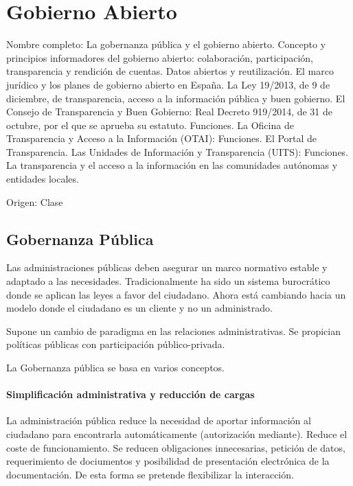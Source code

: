 \setcounter{section}{24}
\section{Gobierno Abierto}

Nombre completo: La gobernanza pública y el gobierno abierto. Concepto y principios informadores del gobierno abierto: colaboración, participación, transparencia y rendición de cuentas. Datos abiertos y reutilización. El marco jurídico y los planes de gobierno abierto en España. La Ley 19/2013, de 9 de diciembre, de transparencia, acceso a la información pública y buen gobierno. El Consejo de Transparencia y Buen Gobierno: Real Decreto 919/2014, de 31 de octubre, por el que se aprueba su estatuto. Funciones. La Oficina de Transparencia y Acceso a la Información (OTAI): Funciones. El Portal de Transparencia. Las Unidades de Información y Transparencia (UITS): Funciones. La transparencia y el acceso a la información en las comunidades autónomas y entidades locales.

Origen: Clase

\localtableofcontents

\subsection{Gobernanza Pública}
    \noindent{}

    Las administraciones públicas deben asegurar un marco normativo estable y adaptado a las necesidades. Tradicionalmente ha sido un sistema burocrático donde se aplican las leyes a favor del ciudadano. Ahora está cambiando hacia un modelo donde el ciudadano es un cliente y no un administrado.

    Supone un cambio de paradigma en las relaciones administrativas. Se propician políticas públicas con participación público-privada.

    La Gobernanza pública se basa en varios conceptos.
    \paragraph{Simplificación administrativa y reducción de cargas}
        La administración pública reduce la necesidad de aportar información al ciudadano para encontrarla automáticamente (autorización mediante). Reduce el coste de funcionamiento. Se reducen obligaciones innecesarias, petición de datos, requerimiento de dociumentos y posibilidad de presentación electrónica de la documentación. De esta forma se  pretende flexibilizar la interacción.

